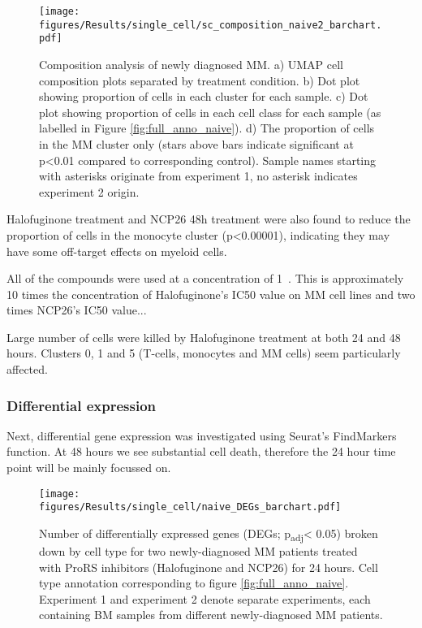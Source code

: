 \begin{figure}[htb]
\centering
\texttt{[image: figures/Results/single\_cell/sc\_composition\_naive2\_barchart.pdf]}
\caption[scRNA-seq composition analysis- newly diagnosed MM]{Composition analysis of newly diagnosed MM.
    a) UMAP cell composition plots separated by treatment condition.
    b) Dot plot showing proportion of cells in each cluster for each sample.
    c) Dot plot showing proportion of cells in each cell class for each sample (as labelled in Figure \ref{fig:full_anno_naive}).
    d) The proportion of cells in the MM cluster only (stars above bars indicate significant at p<0.01 compared to corresponding control).
    Sample names starting with asterisks originate from experiment 1, no asterisk indicates experiment 2 origin.}
\label{fig:composition_naive}
\end{figure}

Halofuginone treatment and NCP26 48h treatment were also found to reduce the proportion of cells in the monocyte cluster (p<0.00001), indicating they may have some off-target effects on myeloid cells.

All of the compounds were used at a concentration of 1\si{\micro\Molar}.
This is approximately 10 times the concentration of Halofuginone's IC50 value on MM cell lines and two times NCP26's IC50 value...

Large number of cells were killed by Halofuginone treatment at both 24 and 48 hours.
Clusters 0, 1 and 5 (T-cells, monocytes and MM cells) seem particularly affected.

\subsubsection{Differential expression}
Next, differential gene expression was investigated using Seurat's FindMarkers function.
At 48 hours we see substantial cell death, therefore the 24 hour time point will be mainly focussed on.
%
\begin{figure}[htb]
\centering
\texttt{[image: figures/Results/single\_cell/naive\_DEGs\_barchart.pdf]}
\caption[scRNA-seq DEGs per cell type]{Number of differentially expressed genes (DEGs; p\textsubscript{adj}< 0.05) broken down by cell type for two newly-diagnosed MM patients treated with ProRS inhibitors (Halofuginone and NCP26) for 24 hours.
Cell type annotation corresponding to figure \ref{fig:full_anno_naive}.
Experiment 1 and experiment 2 denote separate experiments, each containing BM samples from different newly-diagnosed MM patients.}
\label{fig:naive_deg_bar}
\end{figure}

